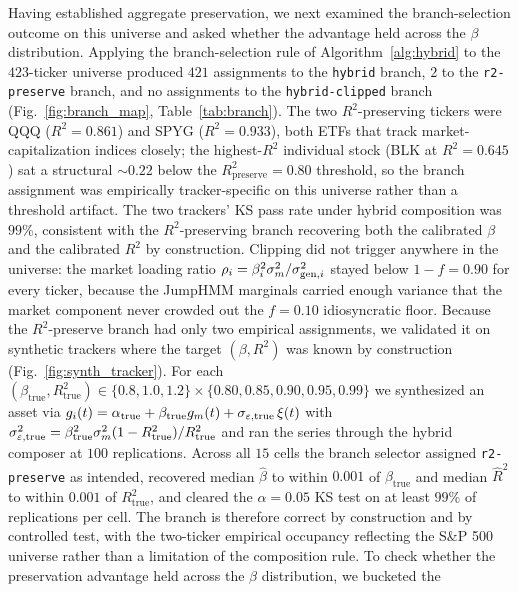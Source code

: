 Having established aggregate preservation, we next examined the
branch-selection outcome on this universe and asked whether the
advantage held across the $\beta$ distribution. Applying the
branch-selection rule of Algorithm~\ref{alg:hybrid} to the
$423$-ticker universe produced $421$ assignments to the
\texttt{hybrid} branch, $2$ to the \texttt{r2-preserve} branch, and
no assignments to the \texttt{hybrid-clipped} branch
(Fig.~\ref{fig:branch_map}, Table~\ref{tab:branch}). The two
$R^2$-preserving tickers were QQQ ($R^2 = 0.861$) and SPYG
($R^2 = 0.933$), both ETFs that track market-capitalization indices
closely; the highest-$R^2$ individual stock (BLK at $R^2 = 0.645$)
sat a structural $\sim 0.22$ below the
$R^2_{\mathrm{preserve}} = 0.80$ threshold, so the branch
assignment was empirically tracker-specific on this universe rather
than a threshold artifact. The two trackers' KS pass rate under
hybrid composition was $99\%$,
consistent with the $R^2$-preserving branch recovering both the
calibrated $\beta$ and the calibrated $R^2$ by construction. Clipping
did not trigger anywhere in the universe: the market loading ratio
$\rho_i = \beta_i^2 \sigma_m^2 / \sigma_{\mathrm{gen},i}^2$ stayed below
$1 - f = 0.90$ for every ticker, because the JumpHMM marginals
carried enough variance that the market component never crowded out
the $f = 0.10$ idiosyncratic floor. Because the $R^2$-preserve branch
had only two empirical assignments, we validated it on synthetic
trackers where the target $(\beta, R^2)$ was known by construction
(Fig.~\ref{fig:synth_tracker}). For each $(\beta_{\mathrm{true}},
R^2_{\mathrm{true}}) \in \{0.8, 1.0, 1.2\} \times \{0.80, 0.85, 0.90,
0.95, 0.99\}$ we synthesized an asset via
$g_i(t) = \alpha_{\mathrm{true}} + \beta_{\mathrm{true}} g_m(t) +
\sigma_{\varepsilon,\mathrm{true}}\,\xi(t)$ with $\sigma_{\varepsilon,\mathrm{true}}^2
= \beta_{\mathrm{true}}^2 \sigma_m^2 (1 - R^2_{\mathrm{true}}) /
R^2_{\mathrm{true}}$ and ran the series through the hybrid composer at
$100$ replications. Across all $15$ cells the branch selector assigned
\texttt{r2-preserve} as intended, recovered median $\hat\beta$ to
within $0.001$ of $\beta_{\mathrm{true}}$ and median $\hat{R}^2$ to
within $0.001$ of $R^2_{\mathrm{true}}$, and cleared the $\alpha = 0.05$
KS test on at least $99\%$ of replications per cell. The branch is
therefore correct by construction and by controlled test, with the
two-ticker empirical occupancy reflecting the S\&P 500 universe rather
than a limitation of the composition rule. To check whether the preservation
advantage held across the $\beta$ distribution, we bucketed the
